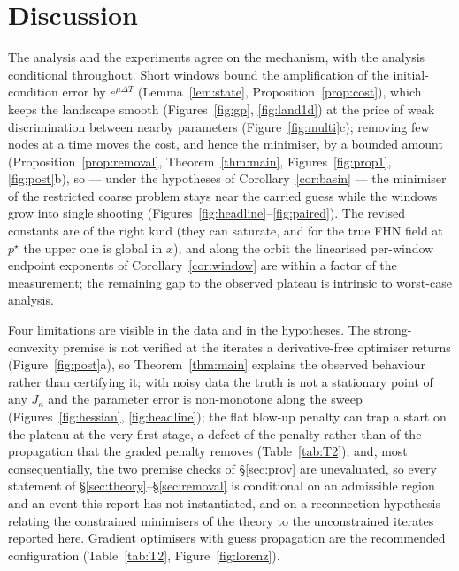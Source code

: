 \documentclass[11pt]{article}
\theoremstyle{remark}\newtheorem{remark}{Remark}
\newcommand{\pstar}{p^\star}
\begin{document}
\section{Discussion}\label{sec:disc}
The analysis and the experiments agree on the mechanism, with the analysis conditional throughout. Short windows bound the amplification of the initial-condition error by $e^{\mu\Delta T}$ (Lemma~\ref{lem:state}, Proposition~\ref{prop:cost}), which keeps the landscape smooth (Figures~\ref{fig:gp}, \ref{fig:land1d}) at the price of weak discrimination between nearby parameters (Figure~\ref{fig:multi}c); removing few nodes at a time moves the cost, and hence the minimiser, by a bounded amount (Proposition~\ref{prop:removal}, Theorem~\ref{thm:main}, Figures~\ref{fig:prop1}, \ref{fig:post}b), so --- under the hypotheses of Corollary~\ref{cor:basin} --- the minimiser of the restricted coarse problem stays near the carried guess while the windows grow into single shooting (Figures~\ref{fig:headline}--\ref{fig:paired}). The revised constants are of the right kind (they can saturate, and for the true FHN field at $\pstar$ the upper one is global in $x$), and along the orbit the linearised per-window endpoint exponents of Corollary~\ref{cor:window} are within a factor of the measurement; the remaining gap to the observed plateau is intrinsic to worst-case analysis.

Four limitations are visible in the data and in the hypotheses. The strong-convexity premise is not verified at the iterates a derivative-free optimiser returns (Figure~\ref{fig:post}a), so Theorem~\ref{thm:main} explains the observed behaviour rather than certifying it; with noisy data the truth is not a stationary point of any $J_\kappa$ and the parameter error is non-monotone along the sweep (Figures~\ref{fig:hessian}, \ref{fig:headline}); the flat blow-up penalty can trap a start on the plateau at the very first stage, a defect of the penalty rather than of the propagation that the graded penalty removes (Table~\ref{tab:T2}); and, most consequentially, the two premise checks of \S\ref{sec:prov} are unevaluated, so every statement of \S\ref{sec:theory}--\S\ref{sec:removal} is conditional on an admissible region and an event this report has not instantiated, and on a reconnection hypothesis relating the constrained minimisers of the theory to the unconstrained iterates reported here. Gradient optimisers with guess propagation are the recommended configuration (Table~\ref{tab:T2}, Figure~\ref{fig:lorenz}).
\end{document}
